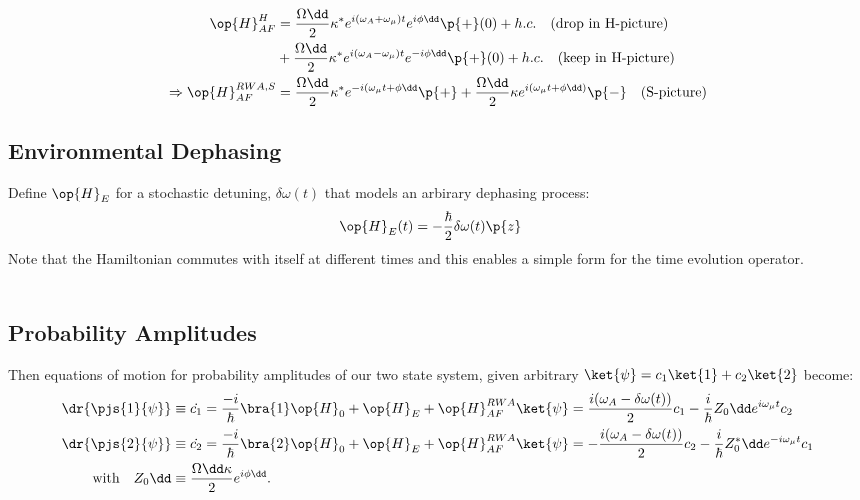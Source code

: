 \begin{align}
\op{H}_{AF}^H &= \frac{\Omega\dd}{2} \kappa^* e^{i(\omega_A + \omega_\mu)t}e^{i\phi\dd}\p{+}(0) + h.c. \quad \text{(drop in H-picture)}\\
&+ \frac{\Omega\dd}{2} \kappa^* e^{i(\omega_A - \omega_\mu )t}e^{-i\phi\dd}\p{+}(0) + h.c. \quad \text{(keep in H-picture)} \\
\Rightarrow  \op{H}_{AF}^{RWA, S} &= \frac{\Omega\dd}{2} \kappa^*
 e^{-i( \omega_\mu t + \phi\dd}\p{+} + \frac{\Omega\dd}{2} \kappa e^{i( \omega_\mu t + \phi\dd)}\p{-} \quad \text{(S-picture)}
\end{align}

\subsection{Environmental Dephasing}

Define $\op{H}_E$ for a stochastic detuning, $\delta \omega (t)$ that models an arbirary dephasing process:
\begin{align}
\op{H}_{E}(t) & = -\frac{\hbar}{2}\delta \omega (t) \p{z}
\end{align}
Note that the Hamiltonian commutes with itself at different times and this enables a simple form for the time evolution operator.
\\
\\


\subsection{Probability Amplitudes}
Then equations of motion for probability amplitudes of our two state system, given arbitrary $\ket{\psi} = c_1 \ket{1} + c_2\ket{2} $ become:
\begin{align}
\dr{\pjs{1}{\psi}} &\equiv \dot{c_1} = \frac{-i}{\hbar}\bra{1} \op{H}_0 + \op{H}_{E} + \op{H}_{AF}^{RWA}
  \ket{\psi} = \frac{i(\omega_A - \delta\omega(t)) }{2}c_1 - \frac{i}{\hbar}Z_0\dd e^{i\omega_\mu t}c_2\\
\dr{\pjs{2}{\psi}} &\equiv \dot{c_2} = \frac{-i}{\hbar}\bra{2} \op{H}_0 + \op{H}_{E} + \op{H}_{AF}^{RWA}  \ket{\psi} = -\frac{i(\omega_A - \delta\omega(t)) }{2}c_2 - \frac{i}{\hbar}Z_0^*\dd e^{-i\omega_\mu t}c_1\\
\text{with} \quad Z_0\dd &\equiv \frac{\Omega\dd\kappa}{2}e^{i\phi\dd}.
\end{align}
\\
\\

